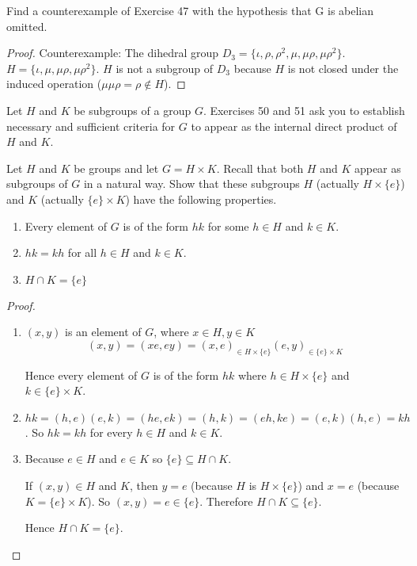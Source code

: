 \newpage
\begin{exercise}
    Find a counterexample of Exercise 47 with the hypothesis that G is abelian omitted.
\end{exercise}

\begin{proof}
    Counterexample: The dihedral group $D_{3} = \{ \iota, \rho, \rho^{2}, \mu, \mu\rho, \mu\rho^{2} \}$. $H = \{ \iota, \mu, \mu\rho, \mu\rho^{2} \}$. $H$ is not a subgroup of $D_{3}$ because $H$ is not closed under the induced operation ($\mu\mu\rho = \rho \notin H$).
\end{proof}

Let $H$ and $K$ be subgroups of a group $G$. Exercises 50 and 51 ask you to establish necessary and sufficient criteria for $G$ to appear as the internal direct product of $H$ and $K$.

\newpage
\begin{exercise}
    Let $H$ and $K$ be groups and let $G = H \times K$. Recall that both $H$ and $K$ appear as subgroups of $G$ in a natural way. Show that these subgroups $H$ (actually $H \times \{e\}$) and $K$ (actually $\{e\} \times K$) have the following properties.
    \begin{enumerate}[label={\textbf{\alph*.}}]
        \item Every element of $G$ is of the form $hk$ for some $h\in H$ and $k\in K$.
        \item $hk = kh$ for all $h\in H$ and $k\in K$.
        \item $H\cap K = \{ e \}$
    \end{enumerate}
\end{exercise}

\begin{proof}
    \begin{enumerate}[label={\textbf{\alph*.}}]
        \item $(x, y)$ is an element of $G$, where $x\in H, y\in K$
              \[
                  (x, y) = (xe, ey) = {(x, e)}_{\in H\times\{e\}}{(e, y)}_{\in\{e\}\times K}
              \]

              Hence every element of $G$ is of the form $hk$ where $h\in H\times\{e\}$ and $k\in\{e\}\times K$.
        \item $hk = (h,e)(e,k) = (he,ek) = (h,k) = (eh,ke) = (e,k)(h,e) = kh$. So $hk = kh$ for every $h\in H$ and $k\in K$.
        \item Because $e\in H$ and $e\in K$ so $\{e\} \subseteq H\cap K$.

              If $(x,y)\in H$ and $K$, then $y = e$ (because $H$ is $H\times\{e\}$) and $x = e$ (because $K = \{e\}\times K$). So $(x,y) = e\in \{e\}$. Therefore $H\cap K\subseteq \{e\}$.

              Hence $H\cap K = \{e\}$.
    \end{enumerate}
\end{proof}


